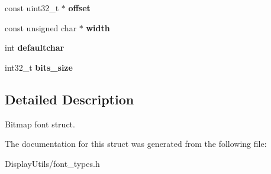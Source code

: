 \begin{DoxyCompactItemize}
const uint32\+\_\+t $\ast$ {\bfseries offset}
\item 
\mbox{\label{structfont__descriptor__t_a15c94573c8690a0ec940e3da4c80b0b9}} 
const unsigned char $\ast$ {\bfseries width}
\item 
\mbox{\label{structfont__descriptor__t_a5bfad8f5e932dee64c856bce858f88d0}} 
int {\bfseries defaultchar}
\item 
\mbox{\label{structfont__descriptor__t_a335c226d88f77b41d82ed53d6d28c022}} 
int32\+\_\+t {\bfseries bits\+\_\+size}
\end{DoxyCompactItemize}


\subsection{Detailed Description}
Bitmap font struct. 

The documentation for this struct was generated from the following file\+:\begin{DoxyCompactItemize}
\item 
Display\+Utils/font\+\_\+types.\+h\end{DoxyCompactItemize}
